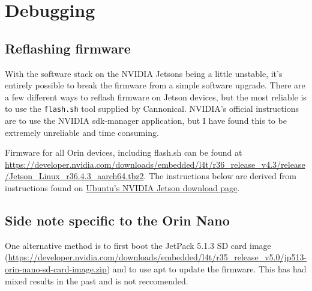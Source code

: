 \documentclass[11pt]{article}
\begin{document}
\section{Debugging}

\subsection{Reflashing firmware}
\label{sec:debug-reflash_firmware}

With the software stack on the NVIDIA Jetsons being a little unstable, it's entirely possible to break the firmware from a simple software upgrade. There are a few different ways to reflash firmware on Jetson devices, but the  most reliable is to use the \texttt{flash.sh} tool supplied by Cannonical. NVIDIA's official instructions are to use the NVIDIA sdk-manager application, but I have found this to be extremely unreliable and time consuming.

Firmware for all Orin devices, including flash.sh can be found at \href{https://developer.nvidia.com/downloads/embedded/l4t/r36_release_v4.3/release/Jetson_Linux_r36.4.3_aarch64.tbz2}{https://developer.nvidia.com/downloads/embedded/l4t/r36\_release\_v4.3/release/Jetson\_Linux\_r36.4.3\_aarch64.tbz2}. The instructions below are derived from instructions found on \href{https://ubuntu.com/download/nvidia-jetson}{Ubuntu's NVIDIA Jetson download page}.

\subsection{Side note specific to the Orin Nano}

One alternative method is to first boot the JetPack 5.1.3 SD card image (\href{https://developer.nvidia.com/downloads/embedded/l4t/r35_release_v5.0/jp513-orin-nano-sd-card-image.zip}{https://developer.nvidia.com/downloads/embedded/l4t/r35\_release\_v5.0/jp513-orin-nano-sd-card-image.zip}) and to use apt to update the firmware. This has had mixed results in the past and is not reccomended.

\printbibliography
\end{document}
